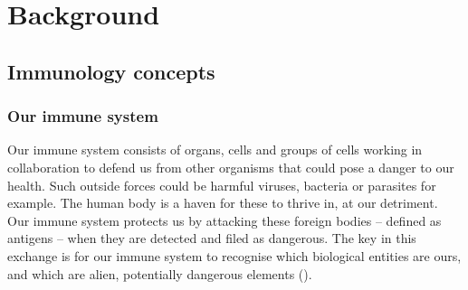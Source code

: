
\chapter{Background}

\section{Immunology concepts}

\subsection{Our immune system} \label{bg:immunesystem}

Our immune system consists of organs, cells and groups of cells working in collaboration to defend us from other organisms that could pose a danger to our health. Such outside forces could be harmful viruses, bacteria or parasites for example. The human body is a haven for these to thrive in, at our detriment. Our immune system protects us by attacking these foreign bodies – defined as antigens – when they are detected and filed as dangerous. The key in this exchange is for our immune system to recognise which biological entities are ours, and which are alien, potentially dangerous elements (\cite{http://www.imgt.org/IMGTeducation/Tutorials/ImmuneSystem/UK/the_immune_system.pdf}).

